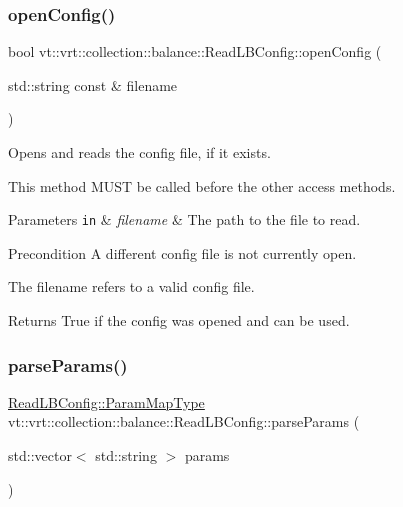 \subsubsection{\texorpdfstring{open\+Config()}{openConfig()}}
{\footnotesize\ttfamily bool vt\+::vrt\+::collection\+::balance\+::\+Read\+L\+B\+Config\+::open\+Config (\begin{DoxyParamCaption}\item[{std\+::string const \&}]{filename }\end{DoxyParamCaption})\hspace{0.3cm}{\ttfamily [static]}}



Opens and reads the config file, if it exists. 

This method M\+U\+ST be called before the other access methods.


\begin{DoxyParams}[1]{Parameters}
\mbox{\tt in}  & {\em filename} & The path to the file to read.\\
\hline
\end{DoxyParams}
\begin{DoxyPrecond}{Precondition}
A different config file is not currently open. 

The filename refers to a valid config file.
\end{DoxyPrecond}
\begin{DoxyReturn}{Returns}
True if the config was opened and can be used. 
\end{DoxyReturn}
\mbox{\label{structvt_1_1vrt_1_1collection_1_1balance_1_1_read_l_b_config_a815d255cc8ca02dd7ead153b9dc20623}} 
\subsubsection{\texorpdfstring{parse\+Params()}{parseParams()}}
{\footnotesize\ttfamily \hyperlink{structvt_1_1vrt_1_1collection_1_1balance_1_1_read_l_b_config_a539bba2e8e767f2aa9923c6616088404}{Read\+L\+B\+Config\+::\+Param\+Map\+Type} vt\+::vrt\+::collection\+::balance\+::\+Read\+L\+B\+Config\+::parse\+Params (\begin{DoxyParamCaption}\item[{std\+::vector$<$ std\+::string $>$}]{params }\end{DoxyParamCaption})\hspace{0.3cm}{\ttfamily [static]}}


